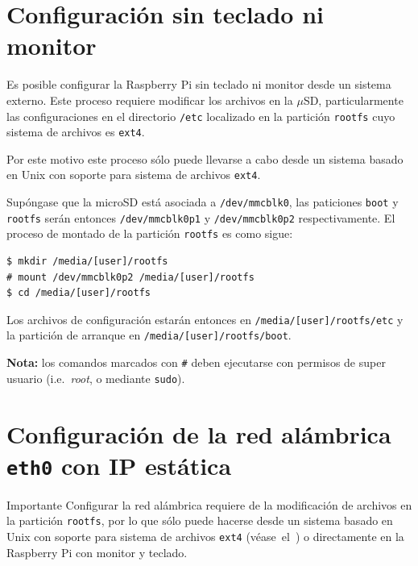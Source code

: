 \documentclass[letterpaper,10.5pt]{article}
\begin{document}
%
%
\appendix%
\section{Configuración sin teclado ni monitor}%
\label{sec:setup-headless}
Es posible configurar la Raspberry Pi sin teclado ni monitor desde un sistema externo.
Este proceso requiere modificar los archivos en la $\mu{}$SD, particularmente las configuraciones en el directorio \texttt{/etc} localizado en la partición \texttt{rootfs} cuyo sistema de archivos es \texttt{ext4}.

Por este motivo este proceso sólo puede llevarse a cabo desde un sistema basado en Unix con soporte para sistema de archivos \texttt{ext4}.

Supóngase que la microSD está asociada a \texttt{/dev/mmcblk0}, las paticiones \texttt{boot} y \texttt{rootfs} serán entonces \texttt{/dev/mmcblk0p1} y \texttt{/dev/mmcblk0p2} respectivamente.
El proceso de montado de la partición \texttt{rootfs} es como sigue:

\begin{Verbatim}[fontsize=\footnotesize]
$ mkdir /media/[user]/rootfs
# mount /dev/mmcblk0p2 /media/[user]/rootfs
$ cd /media/[user]/rootfs
\end{Verbatim}

Los archivos de configuración estarán entonces en
	\texttt{/media/[user]/rootfs/etc}
y la partición de arranque en
	\texttt{/media/[user]/rootfs/boot}.

\noindent
\textbf{Nota:} los comandos marcados con \texttt{\#} deben ejecutarse con permisos de super usuario (i.e.~\emph{root}, o mediante \texttt{sudo}).



\section{Configuración de la red alámbrica \texttt{eth0} con IP estática}%
\label{sec:setup-eth0}
\begin{importantbox}{Importante}
Configurar la red alámbrica requiere de la modificación de archivos en la partición \texttt{rootfs}, por lo que sólo puede hacerse desde un sistema basado en Unix con soporte para sistema de archivos \texttt{ext4} (véase~el~) o directamente en la Raspberry Pi con monitor y teclado.
\end{importantbox}
\end{document}
